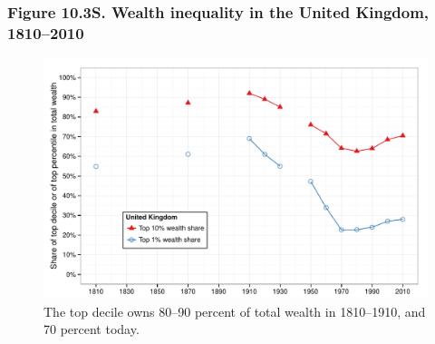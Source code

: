\documentclass[t]{beamer}\usepackage[]{graphicx}\usepackage[]{color}
\newenvironment{knitrout}{}{} %
\begin{document}
\begin{frame}[label=Figure_10_3S]
\frametitle{Figure 10.3S. Wealth inequality in the United Kingdom, 1810--2010}
\begin{figure}[t]
\begin{minipage}[b]{\textwidth}
\centering
\begin{knitrout}\footnotesize
{}\color{fgcolor}

{\centering \includegraphics[width=1\linewidth]{figures/color/Figure_10_3S} 

}



\end{knitrout}
\caption{The top decile owns 80--90 percent of total wealth in 1810--1910, and 70 percent today.}
\end{minipage}
\end{figure}
\end{frame}
\end{document}
